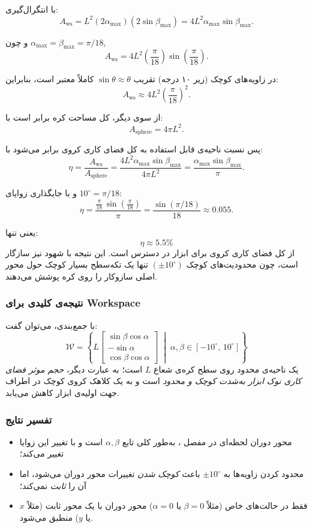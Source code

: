 \documentclass{article}
\begin{document}
با انتگرال‌گیری:
\[
A_{\mathrm{ws}}
= L^2 \left(2\alpha_{\max}\right)
\left(2\sin\beta_{\max}\right)
= 4L^2 \alpha_{\max}\sin\beta_{\max}.
\]

و چون \(\alpha_{\max}=\beta_{\max}=\pi/18\),
\[
A_{\mathrm{ws}}
= 4L^2
\left(\frac{\pi}{18}\right)\sin\left(\frac{\pi}{18}\right).
\]

در زاویه‌های کوچک (زیر ۱۰ درجه) تقریب
\(
\sin\theta\approx\theta
\)
کاملاً معتبر است، بنابراین:
\[
A_{\mathrm{ws}} \approx
4L^2 \left(\frac{\pi}{18}\right)^2.
\]

از سوی دیگر، کل مساحت کره برابر است با:
\[
A_{\mathrm{sphere}} = 4\pi L^{2}.
\]

پس نسبت ناحیه‌ی قابل استفاده به کل فضای کاری کروی برابر می‌شود با:
\[
\eta
= \frac{A_{\mathrm{ws}}}{A_{\mathrm{sphere}}}
= \frac{4L^2\alpha_{\max}\sin\beta_{\max}}
{4\pi L^2}
= \frac{\alpha_{\max}\sin\beta_{\max}}{\pi}.
\]

و با جایگذاری زوایای \(10^\circ = \pi/18\):
\[
\eta
= 
\frac{\tfrac{\pi}{18}\,\sin(\tfrac{\pi}{18})}{\pi}
= 
\frac{\sin(\pi/18)}{18}
\approx 0.055.
\]

یعنی تنها:
\[
\boxed{\eta \approx 5.5\%}
\]
از کل فضای کاری کروی برای ابزار در دسترس است.  
این نتیجه با شهود نیز سازگار است، چون محدودیت‌های کوچک \((\pm 10^\circ)\) تنها یک تکه‌سطح بسیار کوچک حول محور اصلی سازوکار را روی کره پوشش می‌دهند.


\subsubsection{نتیجه‌ی کلیدی برای Workspace}

با جمع‌بندی، می‌توان گفت:
\[
\boxed{
	\mathcal{W} =
	\left\{
	L
	\begin{bmatrix}
		\sin\beta\cos\alpha\\[2pt]
		-\sin\alpha\\[2pt]
		\cos\beta\cos\alpha
	\end{bmatrix}
	\;\middle|\;
	\alpha,\beta \in [-10^\circ,\,10^\circ]
	\right\}
}
\]
یک ناحیه‌ی محدود روی سطح کره‌ی شعاع \(L\) است؛ به عبارت دیگر، \emph{حجم موثر فضای کاری نوک ابزار به‌شدت کوچک و محدود} است و به یک کلاهک کروی کوچک در اطراف جهت اولیه‌ی ابزار کاهش می‌یابد.

\subsubsection{تفسیر نتایج}


\begin{itemize}
	\item محور دوران لحظه‌ای در مفصل ، به‌طور کلی تابع \(\alpha,\beta\) است و با تغییر این زوایا تغییر می‌کند؛
	\item محدود کردن زاویه‌ها به \(\pm 10^\circ\) باعث \emph{کوچک شدن} تغییرات محور دوران می‌شود، اما آن را \emph{ثابت} نمی‌کند؛
	\item فقط در حالت‌های خاص (مثلاً \(\beta=0\) یا \(\alpha=0\)) محور دوران با یک محور ثابت (مثلاً \(x\) یا \(y\)) منطبق می‌شود.
\end{itemize}
\end{document}
